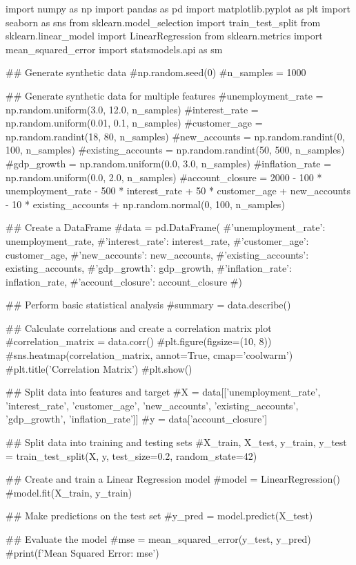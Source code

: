 import numpy as np
import pandas as pd
import matplotlib.pyplot as plt
import seaborn as sns
from sklearn.model_selection import train_test_split
from sklearn.linear_model import LinearRegression
from sklearn.metrics import mean_squared_error
import statsmodels.api as sm

## Generate synthetic data
#np.random.seed(0)
#n_samples = 1000

## Generate synthetic data for multiple features
#unemployment_rate = np.random.uniform(3.0, 12.0, n_samples)
#interest_rate = np.random.uniform(0.01, 0.1, n_samples)
#customer_age = np.random.randint(18, 80, n_samples)
#new_accounts = np.random.randint(0, 100, n_samples)
#existing_accounts = np.random.randint(50, 500, n_samples)
#gdp_growth = np.random.uniform(0.0, 3.0, n_samples)
#inflation_rate = np.random.uniform(0.0, 2.0, n_samples)
#account_closure = 2000 - 100 * unemployment_rate - 500 * interest_rate + 50 * customer_age + new_accounts - 10 * existing_accounts + np.random.normal(0, 100, n_samples)

## Create a DataFrame
#data = pd.DataFrame({
    #'unemployment_rate': unemployment_rate,
    #'interest_rate': interest_rate,
    #'customer_age': customer_age,
    #'new_accounts': new_accounts,
    #'existing_accounts': existing_accounts,
    #'gdp_growth': gdp_growth,
    #'inflation_rate': inflation_rate,
    #'account_closure': account_closure
#})

## Perform basic statistical analysis
#summary = data.describe()

## Calculate correlations and create a correlation matrix plot
#correlation_matrix = data.corr()
#plt.figure(figsize=(10, 8))
#sns.heatmap(correlation_matrix, annot=True, cmap='coolwarm')
#plt.title('Correlation Matrix')
#plt.show()

## Split data into features and target
#X = data[['unemployment_rate', 'interest_rate', 'customer_age', 'new_accounts', 'existing_accounts', 'gdp_growth', 'inflation_rate']]
#y = data['account_closure']

## Split data into training and testing sets
#X_train, X_test, y_train, y_test = train_test_split(X, y, test_size=0.2, random_state=42)

## Create and train a Linear Regression model
#model = LinearRegression()
#model.fit(X_train, y_train)

## Make predictions on the test set
#y_pred = model.predict(X_test)

## Evaluate the model
#mse = mean_squared_error(y_test, y_pred)
#print(f'Mean Squared Error: {mse}')

